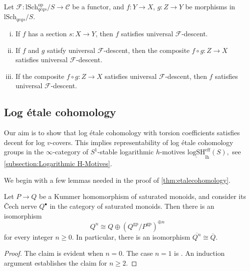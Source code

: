 \documentclass[10pt]{amsart}
\newcommand{\cC}{\mathcal{C}}
\newcommand{\cF}{\mathcal{F}}
\newcommand{\gp}{\mathrm{gp}}
\newcommand{\ul}{\underline}
\newcommand{\ol}{\overline}
\newcommand{\lh}{\mathrm{lh}}
\newcommand{\lSch}{\mathrm{lSch}}
\newcommand{\eff}{\mathrm{eff}}
\newcommand{\logSH}{\mathrm{logSH}}
\begin{document}
\begin{lemma}\label{lem:descentproperties}
Let $\cF \colon \lSch_{qcqs}^{\text{op}}/S \to \cC$ be a functor, 
and $f \colon Y \to X$, $g \colon Z \to Y$ be morphisms in $\lSch_{qcqs}/S$.
\begin{enumerate}[(i), ref =\cref{lem:descentproperties}.(\roman*)]
\item\label{lem:descentproperties.(i)} If $f$ has a section $s \colon X \to Y$, then $f$ satisfies universal $\cF$-descent.
\item\label{lem:descentproperties.(ii)} If $f$ and $g$ satisfy universal $\cF$-descent, 
then the composite $f \circ g \colon Z \to X$ satisfies universal $\cF$-descent. 
\item\label{lem:descentproperties.(iii)} If the composite $f \circ g \colon Z \to X$ satisfies universal $\cF$-descent, then $f$ satisfies universal $\cF$-descent.
\end{enumerate}
\end{lemma}

\subsection{Log étale cohomology}
\label{subsection:Kummer étale cohomology with torsion coefficients}

Our aim is to show that log étale cohomology with torsion coefficients satisfies decent for 
log $v$-covers. 
This implies representability of log \'etale cohomology groups 
in the $\infty$-category of $S^1$-stable logarithmic 
$h$-motives $\ul{\logSH}_{\lh}^\eff(S),$ see \cref{subsection:Logarithmic H-Motives}. 


We begin with a few lemmas needed in the proof of \cref{thm:etalecohomology}.

\begin{lemma}
\label{lem:Kummer}
Let $P\to Q$ be a Kummer homomorphism of saturated monoids,
and consider its \v{C}ech nerve $Q^\bullet$ in the category of saturated monoids.
Then there is an isomorphism
\[
Q^n
\cong
Q\oplus (Q^\gp/P^\gp)^{\oplus n}
\]
for every integer $n\geq 0$.
In particular,
there is an isomorphism $\ol{Q^n}\cong \ol{Q}$.
\end{lemma}
\begin{proof}
The claim is evident when $n=0$.
The case $n=1$ is \cite[Lemma 3.3]{MR1922832}.
An induction argument establishes the claim for $n\geq 2$.
\end{proof}
\end{document}
